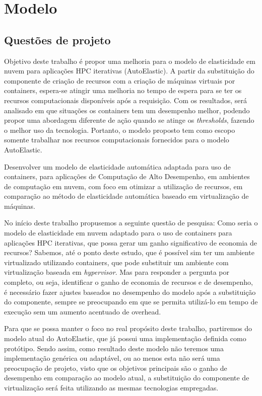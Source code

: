 \documentclass[twoside,english,brazilian]{UNISINOSmonografia}
\begin{document}
\chapter{Modelo}
\label{model}

\section{Questões de projeto}
Objetivo deste trabalho é propor uma melhoria para o modelo de elasticidade em nuvem para aplicações HPC iterativas (AutoElastic). A partir da substituição do componente de criação de recursos com a criação de máquinas virtuais por containers, espera-se atingir uma melhoria no tempo de espera para se ter os recursos computacionais disponíveis após a requisição. Com os resultados, será analisado em que situações os containers tem um desempenho melhor, podendo propor uma abordagem diferente de ação quando se atinge os \textit{thresholds}, fazendo o melhor uso da tecnologia. Portanto, o modelo proposto tem como escopo somente trabalhar nos recursos computacionais fornecidos para o modelo AutoElastic. 

Desenvolver um modelo de elasticidade automática adaptada para uso de containers, para aplicações de Computação de Alto Desempenho, em ambientes de computação em nuvem, com foco em otimizar a utilização de recursos, em comparação ao método de elasticidade automática baseado em virtualização de máquinas.

No início deste trabalho propusemos a seguinte questão de pesquisa: Como seria o modelo de elasticidade em nuvem adaptado para o uso de containers para aplicações HPC iterativas, que possa gerar um ganho significativo de economia de recursos? Sabemos, até o ponto deste estudo, que é possível sim ter um ambiente virtualizado utilizando containers, que pode substituir um ambiente com virtualização baseada em \textit{hypervisor}. Mas para responder a pergunta por completo, ou seja, identificar o ganho de economia de recursos e de desempenho, é necessário fazer ajustes baseados no desempenho do modelo após a substituição do componente, sempre se preocupando em que se permita utilizá-lo em tempo de execução sem um aumento acentuado de overhead.

Para que se possa manter o foco no real propósito deste trabalho, partiremos do modelo atual do AutoElastic, que já possui uma implementação definida como protótipo. Sendo assim, como resultado deste modelo não teremos uma implementação genérica ou adaptável, ou ao menos esta não será uma preocupação de projeto, visto que os objetivos principais são o ganho de desempenho em comparação ao modelo atual, a substituição do componente de virtualização será feita utilizando as mesmas tecnologias empregadas. 
\end{document}
